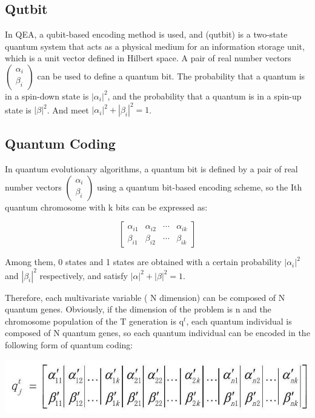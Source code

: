 \documentclass[10pt]{article}
\begin{document}
\subsection{Qutbit}
In QEA, a qubit-based encoding method is used, and (qutbit) is a two-state quantum system that acts as a physical medium for an information storage unit, which is a unit vector defined in Hilbert space. A pair of real number vectors $\left(\begin{array}{c}\alpha_{i} \\ \beta_{i}\end{array}\right)$ can be used to define a quantum bit. The probability that a quantum is in a spin-down state is $\left|\alpha_{i}\right|^{2}$, and the probability that a quantum is in a spin-up state is $|\beta|^{2}$. And meet $\left|\alpha_{i}\right|^{2}+\left|\beta_{i}\right|^{2}=1$.

\subsection{Quantum Coding}
In quantum evolutionary algorithms, a quantum bit is defined by a pair of real number vectors $\left(\begin{array}{c}\alpha_{i} \\ \beta_{i}\end{array}\right)$ using a quantum bit-based encoding scheme, so the Ith quantum chromosome with $\mathrm{k}$ bits can be expressed as:

$$
\left[\begin{array}{cccc}
\alpha_{i 1} & \alpha_{i 2} & \cdots & \alpha_{i k} \\
\beta_{i 1} & \beta_{i 2} & \cdots & \beta_{i k}
\end{array}\right]
$$

Among them, 0 states and 1 states are obtained with a certain probability $\left|\alpha_{i}\right|^{2}$ and $\left|\beta_{i}\right|^{2}$ respectively, and satisfy $|\alpha|^{2}+|\beta|^{2}=1$.

Therefore, each multivariate variable ( $\mathrm{N}$ dimension) can be composed of $\mathrm{N}$ quantum genes. Obviously, if the dimension of the problem is $\mathrm{n}$ and the chromosome population of the $\mathrm{T}$ generation is $\mathrm{q}^{t}$, each quantum individual is composed of $\mathrm{N}$ quantum genes, so each quantum individual can be encoded in the following form of quantum coding:

\begin{center}
\includegraphics[max width=\textwidth]{2023_06_23_b12b6b8aa353d93821cag-04}
\end{center}
\end{document}
